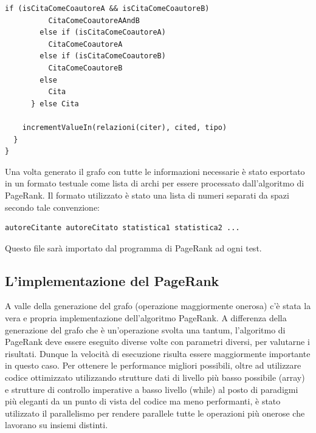 \documentclass[a4paper, 12pt]{article}
\begin{document}
\begin{enumerate}
\begin{lstlisting}[keepspaces=true]
        if (isCitaComeCoautoreA && isCitaComeCoautoreB)
          CitaComeCoautoreAAndB
        else if (isCitaComeCoautoreA)
          CitaComeCoautoreA
        else if (isCitaComeCoautoreB)
          CitaComeCoautoreB
        else
          Cita
      } else Cita

    incrementValueIn(relazioni(citer), cited, tipo)
  }
}  
\end{lstlisting}
Una volta generato il grafo con tutte le informazioni necessarie è stato esportato in un formato testuale come lista di archi per essere processato dall'algoritmo di PageRank.
Il formato utilizzato è stato una lista di numeri separati da spazi secondo tale convenzione:
\begin{lstlisting}[keepspaces=true]
autoreCitante autoreCitato statistica1 statistica2 ...
\end{lstlisting}
Questo file sarà importato dal programma di PageRank ad ogni test.
\end{enumerate}
\subsection{L'implementazione del PageRank}
A valle della generazione del grafo (operazione maggiormente onerosa) c'è stata la vera e propria implementazione dell'algoritmo PageRank.
A differenza della generazione del grafo che è un'operazione svolta una tantum, l'algoritmo di PageRank deve essere eseguito diverse volte con parametri diversi, per valutarne i risultati. Dunque la velocità di esecuzione risulta essere maggiormente importante in questo caso. Per ottenere le performance migliori possibili, oltre ad utilizzare codice ottimizzato utilizzando strutture dati di livello più basso possibile (array) e strutture di controllo imperative a basso livello (while) al posto di paradigmi più eleganti da un punto di vista del codice ma meno performanti, è stato utilizzato il parallelismo per rendere parallele tutte le operazioni più onerose che lavorano su insiemi distinti.
\end{document}
